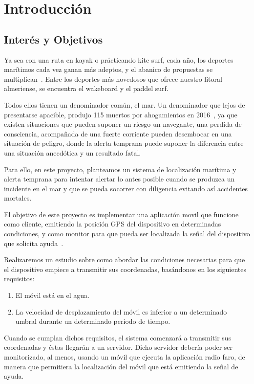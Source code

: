 \chapter{Introducción}
\label{intro}

\section{Interés y Objetivos}

Ya sea con una ruta en kayak o prácticando kite surf, cada año, los deportes
marítimos cada vez ganan más adeptos, y el abanico de propuestas se multiplican~\cite{RDACUA}. Entre los deportes más novedosos que ofrece nuestro litoral almeriense, se encuentra el wakeboard y el paddel surf. 

Todos ellos tienen un denominador común, el mar. Un denominador que lejos de presentarse apacible, produjo 115 muertos por ahogamientos en 2016~\cite{SalvamentoMaritimo}, ya que existen situaciones que pueden suponer un riesgo un navegante, una perdida de consciencia, acompañada de una fuerte corriente pueden desembocar en una situación de peligro, donde la alerta temprana puede suponer la diferencia entre una situación anecdótica y un resultado fatal.

Para ello, en este proyecto, planteamos un sistema de localización marítima y alerta temprana para intentar alertar lo antes posible cuando se produzca un incidente en el mar y que se pueda socorrer con diligencia evitando así accidentes mortales.


El objetivo de este proyecto es implementar una aplicación movil que funcione como cliente, emitiendo la posición GPS del dispositivo en determinadas condiciones, y como monitor para que pueda ser localizada la señal del dispositivo que solicita ayuda~\cite{VRUIZ}.

Realizaremos un estudio sobre como abordar las condiciones necesarias para que el dispositivo empiece a transmitir sus coordenadas, basándonos en los siguientes requisitos:
\begin{enumerate}
\item El móvil está en el agua.
\item La velocidad de desplazamiento del móvil es inferior a un determinado umbral durante un determinado periodo de tiempo.
\end{enumerate}

Cuando se cumplan dichos requisitos, el sistema comenzará a transmitir sus coordenadas y éstas llegarán a un servidor. Dicho servidor debería poder ser monitorizado, al menos, usando un móvil que ejecuta la aplicación radio faro, de manera que permitiera la localización del móvil que está emitiendo la señal de ayuda. 

